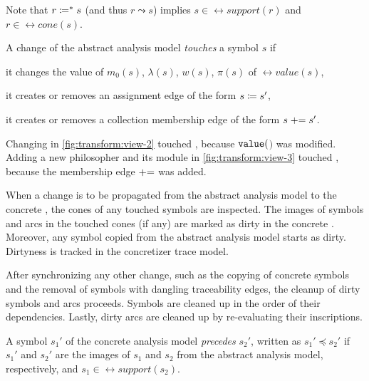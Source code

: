 Note that \(r \coloneq^* s\) (and thus \(r \leadsto s\)) implies \(s \in \rel{support}(r)\) and \(r \in \rel{cone}(s)\).

\begin{dfn}
  A change of the abstract analysis model \emph{touches} a symbol \(s\) if
  \begin{compactitem}
  \item it changes the value of \(m_0(s)\), \(\lambda(s)\), \(w(s)\), \(\pi(s)\) of \(\rel{value}(s)\),
  \item it creates or removes an assignment edge of the form \(s \coloneq s'\),
  \item it creates or removes a collection membership edge of the form \(s \mathrel{{+}{=}} s'\).
  \end{compactitem}
\end{dfn}

\begin{example}
  Changing  in \vref{fig:transform:view-2} touched , because \(\texttt{\upshape value}(\)\()\) was modified. Adding a new philosopher  and its  module  in \vref{fig:transform:view-3} touched , because the membership edge  \(\mathrel{{+}{=}}\)  was added.
\end{example}

When a change is to be propagated from the abstract analysis model to the concrete , the cones of any touched symbols are inspected. The images of symbols and arcs in the touched cones (if any) are marked as dirty in the concrete . Moreover, any symbol copied from the abstract analysis model starts as dirty. Dirtyness is tracked in the concretizer trace model.

After synchronizing any other change, such as the copying of concrete symbols and the removal of symbols with dangling traceability edges, the cleanup of dirty symbols and arcs proceeds. Symbols are cleaned up in the order of their dependencies. Lastly, dirty arcs are cleaned up by re-evaluating their inscriptions.

\begin{dfn}
  A symbol \(s_1'\) of the concrete analysis model \emph{precedes} \(s_2'\), written as \(s_1' \preceq s_2'\) if \(s_1'\) and \(s_2'\) are the images of \(s_1\) and \(s_2\) from the abstract analysis model, respectively, and \(s_1 \in \rel{support}(s_2)\).
\end{dfn}

